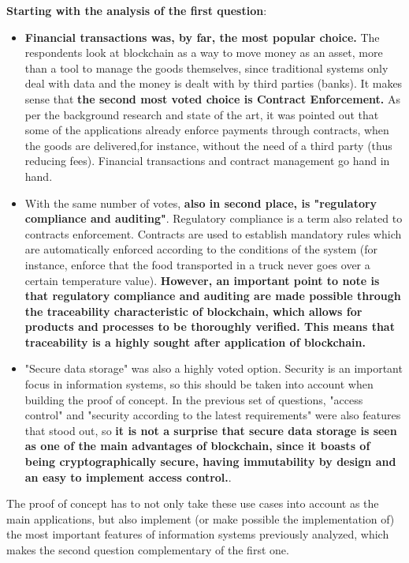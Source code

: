 \textbf{Starting with the analysis of the first question}:
\begin{itemize}
    \item \textbf{Financial transactions was, by far, the most popular choice.} The respondents look at blockchain as a way to move money as an asset, more than a tool to manage the goods themselves, since traditional systems only deal with data and the money is dealt with by third parties (banks). It makes sense that \textbf{the second most voted choice is Contract Enforcement.} As per the background research and state of the art, it was pointed out that some of the applications already enforce payments through contracts, when the goods are delivered,for instance, without the need of a third party (thus reducing fees). Financial transactions and contract management go hand in hand. 
     
    \item With the same number of votes, \textbf{also in second place, is "regulatory compliance and auditing"}. Regulatory compliance is a term also related to contracts enforcement. Contracts are used to establish mandatory rules which are automatically enforced according to the conditions of the system (for instance, enforce that the food transported in a truck never goes over a certain temperature value). \textbf{However, an important point to note is that regulatory compliance and auditing are made possible through the traceability characteristic of blockchain, which allows for products and processes to be thoroughly verified. This means that traceability is a highly sought after application of blockchain.}
    \item "Secure data storage" was also a highly voted option. Security is an important focus in information systems, so this should be taken into account when building the proof of concept. In the previous set of questions, "access control" and "security according to the latest requirements" were also features that stood out, so \textbf{it is not a surprise that secure data storage is seen as one of the main advantages of blockchain, since it boasts of being cryptographically secure, having immutability by design and an easy to implement access control.}. 

\end{itemize}

The proof of concept has to not only take these use cases into account as the main applications, but also implement (or make possible the implementation of) the most important features of information systems previously analyzed, which makes the second question complementary of the first one.

